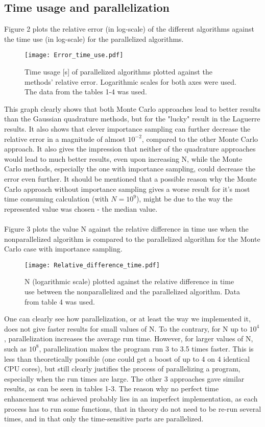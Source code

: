 \documentclass[10pt,a4paper]{article}
\begin{document}
\subsection{Time usage and parallelization}
Figure 2 plots the relative error (in log-scale) of the different algorithms against the time use (in log-scale) for the parallelized algorithms.
\begin{figure}[H]
\centering
\texttt{[image: Error\_time\_use.pdf]}
\caption[Time vs. relative error]{Time usage [s] of parallelized algorithms plotted against the methods' relative error. Logarithmic scales for both axes were used. The data from the tables 1-4 was used.}\label{Error_time_use}
\end{figure}
This graph clearly shows that both Monte Carlo approaches lead to better results than the Gaussian quadrature methods, but for the "lucky" result in the Laguerre results. It also shows that clever importance sampling can further decrease the relative error in a magnitude of almost $10^{-2}$, compared to the  other Monte Carlo approach. It also gives the impression that neither of the quadrature approaches would lead to much better results, even upon increasing N, while the Monte Carlo methods, especially the one with importance sampling, could decrease the error even further. It should be mentioned that a possible reason why the Monte Carlo approach without importance sampling gives a worse result for it's most time consuming calculation (with $N=10^9$), might be due to the way the represented value was chosen - the median value. \\\\
Figure 3 plots the value N against the relative difference in time use when the nonparallelized algorithm is compared to the parallelized algorithm for the Monte Carlo case with importance sampling.
\begin{figure}[H]
\centering
\texttt{[image: Relative\_difference\_time.pdf]}
\caption[N vs. relative time use]{N (logarithmic scale) plotted against the relative difference in time use between the nonparallelized and the parallelized algorithm. Data from table 4 was used.}\label{N vs. relative time use}
\end{figure}
One can clearly see how parallelization, or at least the way we implemented it, does not give faster results for small values of N. To the contrary, for N up to $10^4$, parallelization increases the average run time. However, for larger values of N, such as $10^8$, parallelization makes the program run 3 to 3.5 times faster. This is less than theoretically possible (one could get a boost of up to 4 on 4 identical CPU cores), but still clearly justifies the process of parallelizing a program, especially when the run times are large. The other 3 approaches gave similar results, as can be seen in tables 1-3. The reason why no perfect time enhancement was achieved probably lies in an imperfect implementation, as each process has to run some functions, that in theory do not need to be re-run several times, and in that only the time-sensitive parts are parallelized.\\\\
\end{document}
